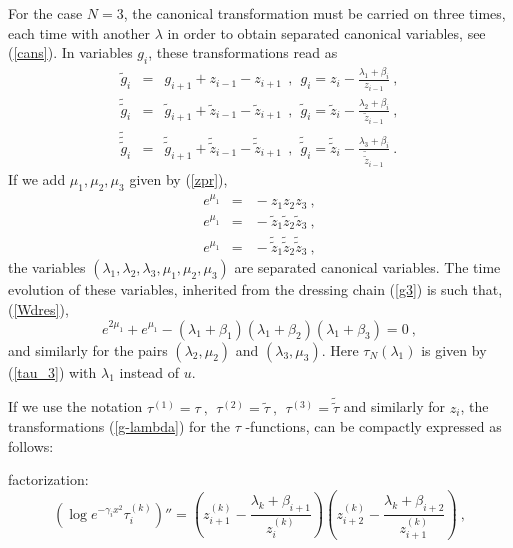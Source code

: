\documentclass[a4paper,11pt]{article}
\begin{document}
For the case $N=3$, the canonical transformation must be carried on three times, each
time with another $\lambda$ in order to obtain separated canonical variables,
see (\ref{cans}).
In variables $g_i$, these transformations read as
\begin{eqnarray}
\label{g-lambda}
\tilde{g}_i \!\!\!&=&\!\!\! g_{i+1} +z_{i-1} - z_{i+1}~~,~~
    g_i = z_i - \frac{\lambda_1+\beta_i}{z_{i-1}}~, \nonumber \\
\tilde{\tilde{g}}_i\!\!\!&=&\!\!\! \tilde{g}_{i+1} +\tilde{z}_{i-1} - \tilde{z}_{i+1}~~,~~
    \tilde{g}_i = \tilde{z}_i - \frac{\lambda_2+\beta_i}{\tilde{z}_{i-1}} ~, \\
\tilde{\tilde{\tilde{g}}}_i\!\!\!&=&\!\!\! \tilde{\tilde{g}}_{i+1} +\tilde{\tilde{z}}_{i-1} - \tilde{\tilde{z}}_{i+1}~~,~~
    \tilde{\tilde{g}}_i = \tilde{\tilde{z}}_i - \frac{\lambda_3+\beta_i}{\tilde{\tilde{z}}_{i-1}} ~. \nonumber
\end{eqnarray}
If we add $\mu_1, \mu_2, \mu_3$ given by (\ref{zpr}),
\begin{eqnarray}
\label{g-mu}
e^{\mu_1}\!\!\!&=&\!\!\!-z_1 z_2 z_3 ~,\nonumber \\
e^{\mu_1}\!\!\!&=&\!\!\!-\tilde{z}_1 \tilde{z}_2 \tilde{z}_3~, \\
e^{\mu_1}\!\!\!&=&\!\!\!-\tilde{\tilde{z}}_1 \tilde{\tilde{z}}_2 \tilde{\tilde{z}}_3 ~,\nonumber
\end{eqnarray}
the variables $(\lambda_1 ,\lambda_2 ,\lambda_3 , \mu_1 , \mu_2 , \mu_3)$ are separated
canonical variables. The time evolution of these variables, inherited from the dressing
chain (\ref{g3}) is such that, (\ref{Wdres}),
\begin{equation}
\label{W}
e^{2\mu_1} +  e^{\mu_1}-(\lambda_1+\beta_1)(\lambda_1+\beta_2)(\lambda_1+\beta_3)= 0~,
\end{equation}
and similarly for the pairs $(\lambda_2,\mu_2)$ and $(\lambda_3,\mu_3)$.
Here $\tau_N(\lambda_1)$ is given by (\ref{tau_3}) with $\lambda_1$ instead of $u$.

If we use the notation
$
\tau^{(1)} = \tau~,~~ \tau^{(2)} = \tilde{\tau}~,~~\tau^{(3)} = \tilde{\tilde{\tau}}
$
and similarly for $z_i$,
the transformations (\ref{g-lambda}) for the $\tau$ -functions, can be compactly
expressed as follows:

factorization:
    $$
    \left( \log e^{-\gamma_i x^2} \tau_i^{(k)} \right) ''
    = \left( z_{i+1}^{(k)} - \frac{\lambda_k + \beta_{i+1}}{z_i^{(k)}} \right)
      \left( z_{i+2}^{(k)} - \frac{\lambda_k + \beta_{i+2}}{z_{i+1}^{(k)}} \right)~,
    $$
\end{document}
